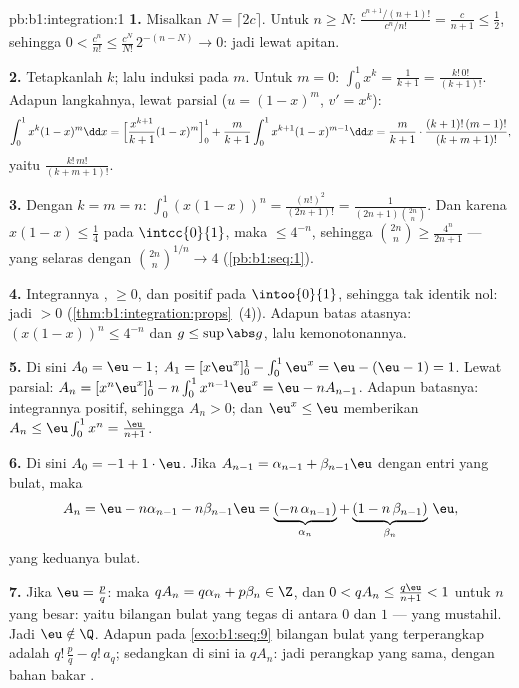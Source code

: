 \begin{solution}{pb:b1:integration:1}
\textbf{1.} Misalkan $N = \lceil 2c \rceil$. Untuk $n \geq N$:
$\frac{c^{n+1}/(n+1)!}{c^n/n!} = \frac{c}{n+1} \leq \frac12$, sehingga
$0 < \frac{c^n}{n!} \leq \frac{c^N}{N!}\,2^{-(n - N)} \to 0$:
jadi lewat apitan.

\textbf{2.} Tetapkanlah $k$; lalu induksi pada $m$. Untuk $m = 0$: $\int_0^1
x^k = \frac{1}{k+1} = \frac{k!\,0!}{(k+1)!}$. Adapun langkahnya, lewat parsial
($u = (1-x)^m$, $v' = x^k$):
\[
\int_0^1 x^k (1-x)^m \dd x
= \Bigl[\frac{x^{k+1}}{k+1}(1-x)^m\Bigr]_0^1
+ \frac{m}{k+1}\int_0^1 x^{k+1}(1-x)^{m-1}\dd x
= \frac{m}{k+1}\cdot\frac{(k+1)!\,(m-1)!}{(k+m+1)!} ,
\]
yaitu $\frac{k!\,m!}{(k+m+1)!}$.

\textbf{3.} Dengan $k = m = n$: $\int_0^1 (x(1-x))^n =
\frac{(n!)^2}{(2n+1)!} = \frac{1}{(2n+1)\binom{2n}{n}}$. Dan karena
$x(1-x) \leq \frac14$ pada $\intcc{0}{1}$, maka  $\leq
4^{-n}$, sehingga $\binom{2n}{n} \geq \frac{4^n}{2n+1}$ ---
yang selaras dengan $\binom{2n}{n}^{1/n} \to 4$
(\cref{pb:b1:seq:1}).

\textbf{4.} Integrannya , $\geq 0$, dan positif
pada $\intoo{0}{1}$, sehingga tak identik nol: jadi 
$> 0$ (\cref{thm:b1:integration:props}~(4)). Adapun batas atasnya:
$(x(1-x))^n \leq 4^{-n}$ dan $g \leq \sup\abs g$, lalu
kemonotonannya.

\textbf{5.} Di sini $A_0 = \eu - 1$; $A_1 = [x\eu^x]_0^1 - \int_0^1
\eu^x = \eu - (\eu - 1) = 1$. Lewat parsial: $A_n = [x^n \eu^x]_0^1 -
n\int_0^1 x^{n-1}\eu^x = \eu - n A_{n-1}$. Adapun batasnya: integrannya
positif, sehingga $A_n > 0$; dan $\eu^x \leq \eu$ memberikan $A_n \leq
\eu\int_0^1 x^n = \frac{\eu}{n+1}$.

\textbf{6.} Di sini $A_0 = -1 + 1\cdot\eu$. Jika $A_{n-1} = \alpha_{n-1} +
\beta_{n-1}\eu$ dengan entri yang bulat, maka
\[
A_n = \eu - n\alpha_{n-1} - n\beta_{n-1}\eu
= \underbrace{(-n\,\alpha_{n-1})}_{\alpha_n}
+ \underbrace{(1 - n\,\beta_{n-1})}_{\beta_n}\,\eu ,
\]
yang keduanya bulat.

\textbf{7.} Jika $\eu = \frac pq$: maka $q A_n = q\alpha_n + p\beta_n
\in \Z$, dan $0 < qA_n \leq \frac{q\eu}{n+1} < 1$ untuk $n$ yang besar:
yaitu bilangan bulat yang tegas di antara $0$ dan $1$ --- yang mustahil. Jadi $\eu
\notin \Q$. Adapun pada \cref{exo:b1:seq:9} bilangan bulat yang terperangkap adalah
$q!\,\frac pq - q!\,a_q$; sedangkan di sini ia $qA_n$: jadi perangkap yang sama, dengan
bahan bakar .


\end{solution}

